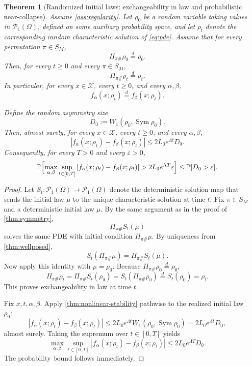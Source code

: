 \documentclass[11pt]{article}
\newtheorem{theorem}{Theorem}[section]
\theoremstyle{definition}
\newcommand{\PP}{\mathcal{P}}
\newcommand{\W}{W_1}
\newcommand{\Sym}{\operatorname{Sym}}
\begin{document}
\begin{theorem}[Randomized initial laws: exchangeability in law and probabilistic near-collapse]
\label{thm:random-init}
Assume \cref{ass:regularity}.
Let $\rho_0$ be a random variable taking values in $\PP_1(\Omega)$,
defined on some auxiliary probability space,
and let $\rho_t$ denote the corresponding random characteristic solution of \eqref{eq:pde}.
Assume that for every permutation $\pi\in S_M$,
\[
  \Pi_{\pi\#}\rho_0
  \stackrel{d}{=}
  \rho_0.
\]
Then, for every $t\ge 0$ and every $\pi\in S_M$,
\[
  \Pi_{\pi\#}\rho_t
  \stackrel{d}{=}
  \rho_t.
\]
In particular, for every $x\in\mathcal X$, every $t\ge 0$, and every $\alpha,\beta$,
\[
  f_\alpha(x;\rho_t)
  \stackrel{d}{=}
  f_\beta(x;\rho_t).
\]

Define the random asymmetry size
\[
  D_0
  :=
  \W(\rho_0,\Sym\rho_0).
\]
Then, almost surely, for every $x\in\mathcal X$, every $t\ge 0$, and every $\alpha,\beta$,
\[
  |f_\alpha(x;\rho_t)-f_\beta(x;\rho_t)|
  \le
  2L_0 e^{\Lambda t} D_0.
\]
Consequently, for every $T>0$ and every $\varepsilon>0$,
\[
  \mathbb P\Bigl[
    \max_{\alpha,\beta}
    \sup_{t\in[0,T]}
    |f_\alpha(x;\rho_t)-f_\beta(x;\rho_t)|
    >
    2L_0 e^{\Lambda T}\varepsilon
  \Bigr]
  \le
  \mathbb P[D_0>\varepsilon].
\]
\end{theorem}

\begin{proof}
Let $S_t:\PP_1(\Omega)\to\PP_1(\Omega)$ denote the deterministic solution map
that sends the initial law $\mu$ to the unique characteristic solution at time $t$.
Fix $\pi\in S_M$ and a deterministic initial law $\mu$.
By the same argument as in the proof of \cref{thm:symmetry},
\[
  \Pi_{\pi\#} S_t(\mu)
\]
solves the same PDE with initial condition $\Pi_{\pi\#}\mu$.
By uniqueness from \cref{thm:wellposed},
\[
  S_t(\Pi_{\pi\#}\mu)=\Pi_{\pi\#}S_t(\mu).
\]
Now apply this identity with $\mu=\rho_0$.
Because $\Pi_{\pi\#}\rho_0\stackrel{d}{=}\rho_0$,
\[
  \Pi_{\pi\#}\rho_t
  =
  \Pi_{\pi\#}S_t(\rho_0)
  =
  S_t(\Pi_{\pi\#}\rho_0)
  \stackrel{d}{=}
  S_t(\rho_0)
  =
  \rho_t.
\]
This proves exchangeability in law at time $t$.

Fix $x,t,\alpha,\beta$.
Apply \cref{thm:nonlinear-stability} pathwise to the realized initial law $\rho_0$:
\[
  |f_\alpha(x;\rho_t)-f_\beta(x;\rho_t)|
  \le
  2L_0 e^{\Lambda t}\W(\rho_0,\Sym\rho_0)
  =
  2L_0 e^{\Lambda t} D_0,
\]
almost surely.
Taking the supremum over $t\in[0,T]$ yields
\[
  \max_{\alpha,\beta}
  \sup_{t\in[0,T]}
  |f_\alpha(x;\rho_t)-f_\beta(x;\rho_t)|
  \le
  2L_0 e^{\Lambda T} D_0.
\]
The probability bound follows immediately.
\end{proof}
\end{document}

